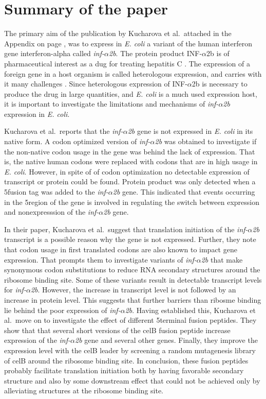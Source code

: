 %
\section{Summary of the paper}
The primary aim of the publication by Kucharova et al.\, attached in the
Appendix on page \pageref{vero_paper}, was to express in \textit{E. coli} a
variant of the human interferon gene interferon-alpha called
\textit{inf-$\alpha$2b}. The protein product INF-$\alpha$2b is of
pharmaceutical interest as a dug for treating hepatitis C
\cite{manns_peginterferon_2001}. The expression of a foreign gene in a host
organism is called heterologous expression, and carries with it many challenges
\cite{gustafsson_codon_2004}. Since heterologous expression of INF-$\alpha$2b
is necessary to produce the drug in large quantities, and \textit{E. coli} is a
much used expression host, it is important to investigate the limitations and
mechanisms of \textit{inf-$\alpha$2b} expression in \textit{E. coli}.

Kucharova et al.\ reports that the \textit{inf-$\alpha$2b} gene is not
expressed in \textit{E.  coli} in its native form. A codon optimized version of
\textit{inf-$\alpha$2b} was obtained to investigate if the non-native codon
usage in the gene was behind the lack of expression. That is, the native human
codons were replaced with codons that are in high usage in \textit{E. coli}.
However, in spite of of codon optimization no detectable expression of
transcript or protein could be found. Protein product was only detected when a
5\ppp fusion tag was added to the \textit{inf-$\alpha$2b} gene. This indicated
that events occurring in the 5\ppp region of the gene is involved in regulating
the switch between expression and nonexpresssion of the \textit{inf-$\alpha$2b}
gene.

In their paper, Kucharova et al.\ suggest that translation initiation of the
\textit{inf-$\alpha$2b} transcript is a possible reason why the gene is not
expressed. Further, they note that codon usage in first translated codons are
also known to impact gene expression. That prompts them to investigate variants
of \textit{inf-$\alpha$2b} that make synonymous codon substitutions to reduce
RNA secondary structures around the ribosome binding site. Some of these
variants result in detectable transcript levels for \textit{inf-$\alpha$2b}.
However, the increase in transcript level is not followed by an increase in
protein level. This suggests that further barriers than ribosme binding lie
behind the poor expression of \textit{inf-$\alpha$2b}. Having established this,
Kucharova et al.\ move on to investigate the effect of different 5\ppp terminal
fusion peptides. They show that that several short versions of the celB fusion
peptide increase expression of the \textit{inf-$\alpha$2b} gene and several
other genes. Finally, they improve the expression level with the celB leader by
screening a random mutagenesis library of celB around the ribosome binding
site. In conclusion, these fusion peptides probably facilitate translation
initiation both by having favorable secondary structure and also by some
downstream effect that could not be achieved only by alleviating structures at
the ribosome binding site.

